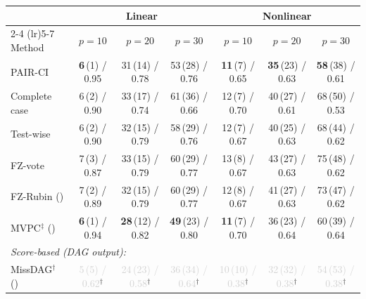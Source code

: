 \begin{tabular}{lcccccc}
    \toprule
                  & \multicolumn{3}{c}{Linear} & \multicolumn{3}{c}{Nonlinear} \\
    \cmidrule(lr){2-4} \cmidrule(lr){5-7}
    Method        & $p{=}10$ & $p{=}20$ & $p{=}30$ & $p{=}10$ & $p{=}20$ & $p{=}30$ \\
    \midrule
    PAIR-CI                                       & \textbf{6}\,{\scriptsize(1)} / 0.95 & 31\,{\scriptsize(14)} / 0.78 & 53\,{\scriptsize(28)} / 0.76 & \textbf{11}\,{\scriptsize(7)} / 0.65 & \textbf{35}\,{\scriptsize(23)} / 0.63 & \textbf{58}\,{\scriptsize(38)} / 0.61 \\
    Complete case                                 & 6\,{\scriptsize(2)} / 0.90 & 33\,{\scriptsize(17)} / 0.74 & 61\,{\scriptsize(36)} / 0.66 & 12\,{\scriptsize(7)} / 0.70 & 40\,{\scriptsize(27)} / 0.61 & 68\,{\scriptsize(50)} / 0.53 \\
    Test-wise                                     & 6\,{\scriptsize(2)} / 0.90 & 32\,{\scriptsize(15)} / 0.79 & 58\,{\scriptsize(29)} / 0.76 & 12\,{\scriptsize(7)} / 0.67 & 40\,{\scriptsize(25)} / 0.63 & 68\,{\scriptsize(44)} / 0.62 \\
    FZ-vote                                       & 7\,{\scriptsize(3)} / 0.87 & 33\,{\scriptsize(15)} / 0.79 & 60\,{\scriptsize(29)} / 0.77 & 13\,{\scriptsize(8)} / 0.67 & 43\,{\scriptsize(27)} / 0.63 & 75\,{\scriptsize(48)} / 0.62 \\
    FZ-Rubin (\citeauthor{witte2022multiple})     & 7\,{\scriptsize(2)} / 0.89 & 32\,{\scriptsize(15)} / 0.79 & 60\,{\scriptsize(29)} / 0.77 & 12\,{\scriptsize(8)} / 0.67 & 41\,{\scriptsize(27)} / 0.63 & 73\,{\scriptsize(47)} / 0.62 \\
    MVPC$^\ddagger$ (\citeauthor{tu2019causal})   & \textbf{6}\,{\scriptsize(1)} / 0.94 & \textbf{28}\,{\scriptsize(12)} / 0.82 & \textbf{49}\,{\scriptsize(23)} / 0.80 & \textbf{11}\,{\scriptsize(7)} / 0.70 & 36\,{\scriptsize(23)} / 0.64 & 60\,{\scriptsize(39)} / 0.64 \\
    \midrule
    \multicolumn{7}{l}{\emph{Score-based (DAG output):}} \\
    MissDAG$^\dagger$ (\citeauthor{gao2022missdag}) & \textcolor{lightgray}{5\,{\scriptsize(5)} / 0.62}$^\dagger$ & \textcolor{lightgray}{24\,{\scriptsize(23)} / 0.58}$^\dagger$ & \textcolor{lightgray}{36\,{\scriptsize(34)} / 0.64}$^\dagger$ & \textcolor{lightgray}{10\,{\scriptsize(10)} / 0.38}$^\dagger$ & \textcolor{lightgray}{32\,{\scriptsize(32)} / 0.38}$^\dagger$ & \textcolor{lightgray}{54\,{\scriptsize(53)} / 0.38}$^\dagger$ \\
    \bottomrule
\end{tabular}
